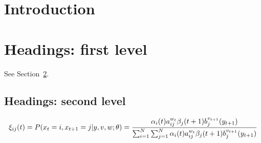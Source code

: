 \documentclass{article}
\begin{document}
\section{Introduction}
\section{Headings: first level}
\label{sec:headings}
See Section~\ref{sec:headings}.

\subsection{Headings: second level}

\begin{equation}
	\xi_{ij}(t) = P(x_{t} = i,x_{t + 1} = j|y,v,w; \theta) \\
	= \frac{\alpha_{i}(t) a^{w_{t}}_{ij} \beta_{j}(t + 1) b^{v_{t + 1}}_{j}(y_{t + 1})}{\sum_{i = 1}^{N} \sum_{j = 1}^{N} \alpha_{i}(t) a^{w_{t}}_{ij} \beta_{j}(t + 1) b^{v_{t + 1}}_{j}(y_{t + 1})}
\end{equation}
\cite{author:title}

\printbibliography
\end{document}
